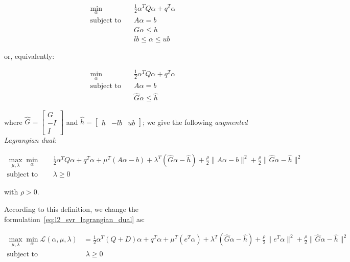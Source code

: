 \begin{equation}
    \begin{aligned} 
        \min_{\alpha} \quad & \frac{1}{2} \alpha^T Q \alpha + q^T \alpha \\
            \textrm{subject to} \quad & A \alpha = b \\ & G \alpha \leq h \\ & lb \leq \alpha \leq ub
    \end{aligned}
\end{equation}

or, equivalently:

\begin{equation}
    \begin{aligned}
        \min_{\alpha} \quad & \frac{1}{2} \alpha^T Q \alpha + q^T \alpha \\
            \textrm{subject to} \quad & A \alpha = b \\ & \hat{G} \alpha \leq \hat{h}
    \end{aligned}
\end{equation}

where $\hat{G} =
\begin{bmatrix}
 G \\
-I \\
 I 
\end{bmatrix}$ and $\hat{h} =
\begin{bmatrix}
h & -lb & ub
\end{bmatrix}$; we give the following \emph{augmented Lagrangian dual}:

\begin{equation} \label{eq:l2_svr_gen_aug_lagrangian_dual}
	\begin{aligned}
		    \max_{\mu,\lambda} \min_{\alpha} \quad & \frac{1}{2} \alpha^T Q \alpha + q^T \alpha + \mu^T (A \alpha - b) + \lambda^T (\hat{G} \alpha - \hat{h}) + \frac{\rho}{2} \| A \alpha - b \|^2 + \frac{\rho}{2} \| \hat{G} \alpha - \hat{h} \|^2 \\
    \text{subject to} \quad & \lambda \geq 0
	\end{aligned}
\end{equation}

with $\rho > 0$.

\bigskip

According to this definition, we change the formulation~\ref{eq:l2_svr_lagrangian_dual} as:

\begin{equation} \label{eq:l2_svr_aug_lagrangian_dual}
	\begin{aligned}
		    \max_{\mu,\lambda} \min_{\alpha} \mathcal{L}(\alpha,\mu,\lambda) &= \frac{1}{2} \alpha^T (Q + D) \alpha+q^T\alpha + \mu^T (e^T \alpha) + \lambda^T (\hat{G} \alpha - \hat{h}) + \frac{\rho}{2} \| e^T \alpha \|^2 + \frac{\rho}{2} \| \hat{G} \alpha - \hat{h} \|^2 \\
    \text{subject to} \quad & \,\, \lambda \geq 0
	\end{aligned}
\end{equation}

